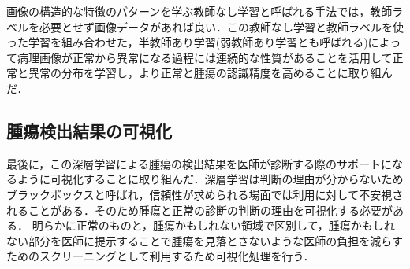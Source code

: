 画像の構造的な特徴のパターンを学ぶ教師なし学習と呼ばれる手法では，教師ラベルを必要とせず画像データがあれば良い．この教師なし学習と教師ラベルを使った学習を組み合わせた，半教師あり学習(弱教師あり学習とも呼ばれる)によって病理画像が正常から異常になる過程には連続的な性質があることを活用して正常と異常の分布を学習し，より正常と腫瘍の認識精度を高めることに取り組んだ．

\subsection*{腫瘍検出結果の可視化}
最後に，この深層学習による腫瘍の検出結果を医師が診断する際のサポートになるように可視化することに取り組んだ．深層学習は判断の理由が分からないためブラックボックスと呼ばれ，信頼性が求められる場面では利用に対して不安視されることがある．そのため腫瘍と正常の診断の判断の理由を可視化する必要がある．
明らかに正常のものと，腫瘍かもしれない領域で区別して，腫瘍かもしれない部分を医師に提示することで腫瘍を見落とさないような医師の負担を減らすためのスクリーニングとして利用するため可視化処理を行う．

